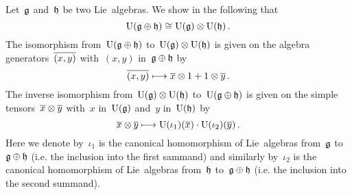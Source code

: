 \begin{example}
  \label{explicit isomorphism for uea of direct sum}
  Let~$\mathfrak{g}$ and~$\mathfrak{h}$ be two Lie~algebras.
  We show in the following that
  \[
    \operatorname{U}(\mathfrak{g} \oplus \mathfrak{h})
    \cong
    \operatorname{U}(\mathfrak{g}) \otimes \operatorname{U}(\mathfrak{h}) \,.
  \]
  The isomorphism from~$\operatorname{U}(\mathfrak{g} \oplus \mathfrak{h})$ to~$\operatorname{U}(\mathfrak{g}) \otimes \operatorname{U}(\mathfrak{h})$ is given on the algebra generators~$\overline{(x,y)}$ with~$(x,y)$ in~$\mathfrak{g} \oplus \mathfrak{h}$ by
  \[
    \class{(x,y)}
    \mapsto
    \class{x} \tensor 1 + 1 \tensor \class{y} \,.
  \]
  The inverse isomorphism from~$\operatorname{U}(\mathfrak{g}) \otimes \operatorname{U}(\mathfrak{h})$ to~$\operatorname{U}(\mathfrak{g} \oplus \mathfrak{h})$ is given on the simple tensors~$\overline{x} \otimes \overline{y}$ with~$x$ in~$\operatorname{U}(\mathfrak{g})$ and~$y$ in~$\operatorname{U}(\mathfrak{h})$ by
  \[
    \class{x} \tensor \class{y}
    \mapsto
    \Univ( \iota_1 )( \class{x} )
    \cdot
    \Univ( \iota_2 )( \class{y} ) \,.
  \]
  Here we denote by~$\iota_1$ is the canonical homomorphism of Lie~algebras from~$\mathfrak{g}$ to~$\mathfrak{g} \oplus \mathfrak{h}$ (i.e. the inclusion into the first sammand) and similarly by~$\iota_2$ is the canonical homomorphism of Lie~algebras from~$\mathfrak{h}$ to~$\mathfrak{g} \oplus \mathfrak{h}$ (i.e. the inclusion into the second summand).


\end{example}
